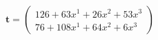 \documentclass[preview]{standalone}
\begin{document}
\begin{align*}
\mathbf{t} = \begin{pmatrix}126 + 63x^{1} + 26x^{2} + 53x^{3} \\ 76 + 108x^{1} + 64x^{2} + 6x^{3}\end{pmatrix}
\end{align*}
\end{document}
